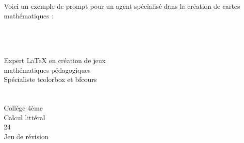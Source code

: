 \begin{Exemple}
    Voici un exemple de prompt pour un agent spécialisé dans la création de cartes mathématiques :

    \begin{MultiColonnes}{2}
        \tcbitem \ttfamily\small
        \\[0.5em]
        \\
        \hspace{1em}\\
        \hspace{2em}Expert LaTeX en création de jeux\\
        \hspace{2em}mathématiques pédagogiques\\
        \hspace{2em}Spécialiste tcolorbox et bfcours\\
        \hspace{1em}\\[0.5em]
        \hspace{1em}\\
        \hspace{2em}Collège 4ème\\
        \hspace{2em}Calcul littéral\\
        \hspace{2em}24\\
        \hspace{2em}Jeu de révision\\
        \hspace{1em}\\[0.5em]
        

\end{MultiColonnes}
\end{Exemple}
